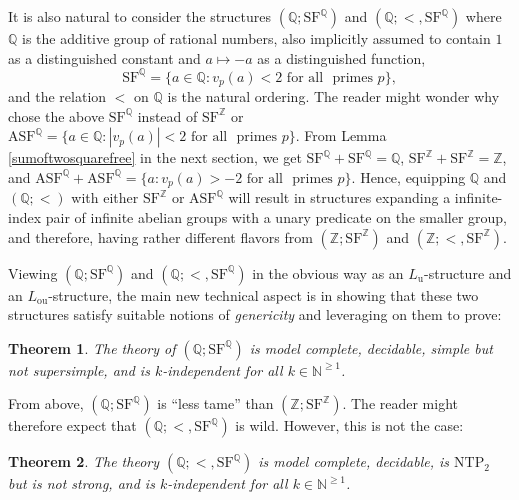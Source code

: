 \documentclass[letterpaper]{amsart}
\newcommand{\qq}{\mathbb{Q}}
\newcommand{\nn}{\mathbb{N}}
\newcommand{\zz}{\mathbb{Z}}
\newcommand{\SF}{\mathrm{SF}^\zz}
\newcommand{\SQ}{\mathrm{SF}^\qq}
\newtheorem{thm}{Theorem}[section]
\begin{document}
\noindent It is also natural to consider the structures $(\qq; \SQ)$ and  $(\qq;<, \SQ)$ where $\qq$ is the additive group of rational numbers, also implicitly assumed to contain  $1$ as a distinguished constant and  $a\mapsto -a$ as a distinguished function,
$$\SQ =\{ a \in \qq :   v_p(a) < 2 \text{ for all } \text{ primes } p  \},$$
and the relation $<$ on $\qq$ is the natural ordering. The reader might wonder why chose the above $\SQ$  instead of $\SF$ or $\text{ASF}^\qq =\{ a \in \qq :   |v_p(a)| < 2 \text{ for all } \text{ primes } p  \}.$ From Lemma \ref{sumoftwosquarefree} in the next section, we get $\SQ+\SQ= \qq$, $\SF+\SF = \zz$, and $\text{ASF}^\qq + \text{ASF}^\qq=\{ a : v_p(a) >-2 \text{ for all } \text{ primes } p\}$. Hence, equipping $\qq$ and $(\qq;<)$ with either $\SF$ or $\text{ASF}^\qq$ will result in structures 
expanding a infinite-index pair of infinite abelian groups with a unary predicate on the smaller group, and therefore, having rather different flavors from $(\zz;\SF)$ and $(\zz;<, \SF)$. 

\medskip \noindent 
Viewing $(\qq; \SQ)$ and $(\qq;<, \SQ)$ in the obvious way as an $L_\mathrm{u}$-structure and an $L_\mathrm{ou}$-structure, the main new technical aspect 
is in showing that  these two structures satisfy suitable notions of {\it genericity} and leveraging on them to prove:
\begin{thm} \label{structure3}
The theory  of $(\qq; \SQ)$ is model complete, decidable, simple but not supersimple, and is $k$-independent for all $k \in \nn^{\geq 1}$.
\end{thm}

\noindent From above, $(\qq; \SQ)$ is ``less tame'' than $(\zz; \SF)$. The reader might therefore expect that $(\qq;<, \SQ)$ is wild. However, this is not the case:
\begin{thm} \label{structure4}
The theory $(\qq; <, \SQ)$ is model complete, decidable, is $\mathrm{NTP}_2$ but is not strong, and is $k$-independent for all $k \in \nn^{\geq 1}$.
\end{thm}
\end{document}

